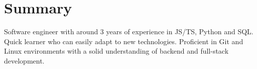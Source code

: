\documentclass[a4paper]{article}
\begin{document}

\fancyhead[C]{
}


\section{Summary}
Software engineer with around 3 years of experience in JS/TS, Python and SQL.
Quick learner who can easily adapt to new technologies.
Proficient in Git and Linux environments with a solid understanding of backend and full-stack development.
\end{document}

